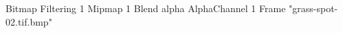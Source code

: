 {Bitmap
	{Filtering 1}
	{Mipmap 1}
	{Blend alpha}
	{AlphaChannel 1}
	{Frame "grass-spot-02.tif.bmp"}
}

